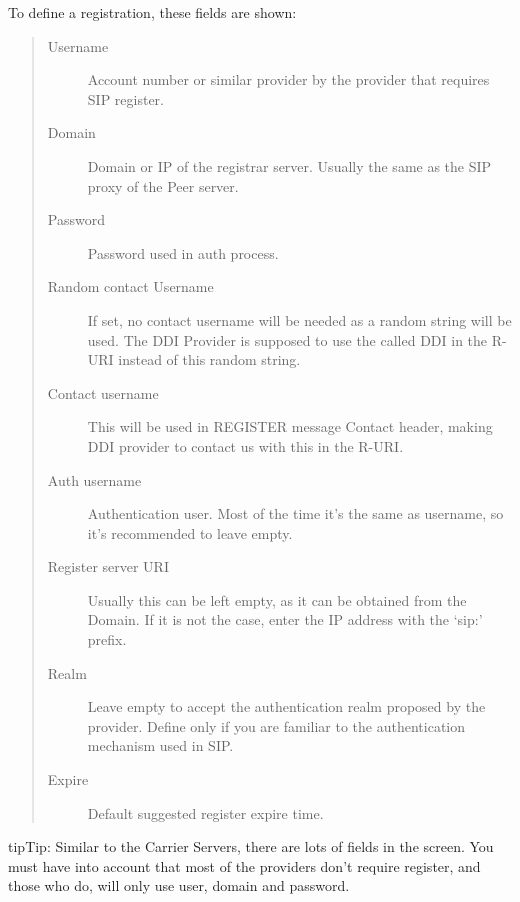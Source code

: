 \documentclass[letterpaper,10pt,english]{sphinxmanual}
\begin{document}
To define a registration, these fields are shown:
\begin{quote}
\begin{description}
\item[{Username}] \leavevmode
Account number or similar provider by the provider that requires SIP
register.

\item[{Domain}] \leavevmode
Domain or IP of the registrar server. Usually the same as the SIP proxy
of the Peer server.

\item[{Password}] \leavevmode
Password used in auth process.

\item[{Random contact Username}] \leavevmode
If set, no contact username will be needed as a random string will be used. The
DDI Provider is supposed to use the called DDI in the R-URI instead of this random string.

\item[{Contact username}] \leavevmode
This will be used in REGISTER message Contact header, making DDI provider to
contact us with this in the R-URI.

\item[{Auth username}] \leavevmode
Authentication user. Most of the time it's the same as username, so
it's recommended to leave empty.

\item[{Register server URI}] \leavevmode
Usually this can be left empty, as it can be obtained from the
Domain. If it is not the case, enter the IP address with the `sip:'
prefix.

\item[{Realm}] \leavevmode
Leave empty to accept the authentication realm proposed by the provider.
Define only if you are familiar to the authentication mechanism used
in SIP.

\item[{Expire}] \leavevmode
Default suggested register expire time.

\end{description}
\end{quote}

\begin{notice}{tip}{Tip:}
Similar to the Carrier Servers, there are lots of fields in the screen.
You must have into account that most of the providers don't require register,
and those who do, will only use user, domain and password.
\end{notice}
\end{document}
